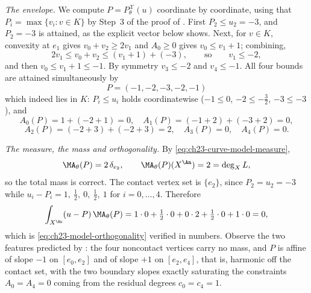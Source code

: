 \begin{example}
\emph{The envelope.}  We compute $P=P^{\mathcal X}_\theta(u)$ coordinate
by coordinate, using that $P_i=\max\{v_i:v\in K\}$ by Step~3 of the proof
of .  First $P_2\leq u_2=-3$, and
$P_2=-3$ is attained, as the explicit vector below shows.  Next, for
$v\in K$, convexity at $e_1$ gives $v_0+v_2\geq2v_1$ and $A_0\geq0$
gives $v_0\leq v_1+1$; combining,
\[
 2v_1\leq v_0+v_2\leq (v_1+1)+(-3),
 \qquad\text{so}\qquad v_1\leq-2 ,
\]
and then $v_0\leq v_1+1\leq-1$.  By symmetry $v_3\leq-2$ and
$v_4\leq-1$.  All four bounds are attained simultaneously by
\[
 \boxed{\ P=(-1,-2,-3,-2,-1)\ }
\]
which indeed lies in $K$: $P_i\leq u_i$ holds coordinatewise
($-1\leq0$, $-2\leq-\tfrac32$, $-3\leq-3$), and
\[
 A_0(P)=1+(-2+1)=0,\quad
 A_1(P)=(-1+2)+(-3+2)=0,
\]
\[
 A_2(P)=(-2+3)+(-2+3)=2,\quad
 A_3(P)=0,\quad
 A_4(P)=0 .
\]

\emph{The measure, the mass and orthogonality.}  By
\eqref{eq:ch23-curve-model-measure},
\[
 \MA_\theta(P)=2\,\delta_{e_2},
 \qquad
 \MA_\theta(P)(X^{\An})=2=\deg_XL ,
\]
so the total mass is correct.  The contact vertex set is $\{e_2\}$, since
$P_2=u_2=-3$ while $u_i-P_i=1,\ \tfrac12,\ 0,\ \tfrac12,\ 1$ for
$i=0,\ldots,4$.  Therefore
\[
 \int_{X^{\An}}(u-P)\,\MA_\theta(P)
 =1\cdot0+\tfrac12\cdot0+0\cdot2+\tfrac12\cdot0+1\cdot0=0 ,
\]
which is \eqref{eq:ch23-model-orthogonality} verified in numbers.  Observe
the two features predicted by
: the four noncontact vertices
carry no mass, and $P$ is affine of slope $-1$ on $[e_0,e_2]$ and of
slope $+1$ on $[e_2,e_4]$, that is, harmonic off the contact set, with
the two boundary slopes exactly saturating the constraints
$A_0=A_4=0$ coming from the residual degrees $c_0=c_4=1$.


\end{example}
